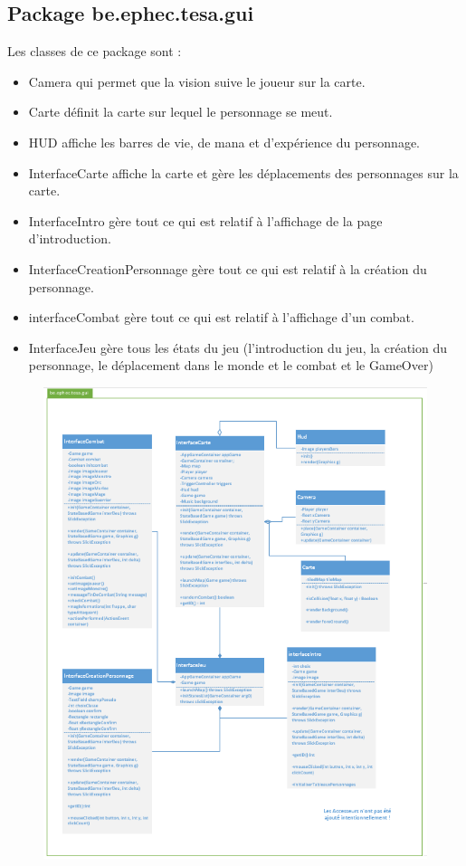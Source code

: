 \documentclass[a4paper,titlepage]{article}
\begin{document}
	\newpage
	\subsection{Package \og be.ephec.tesa.gui \fg{} }
	Les classes de ce package sont :
	\begin{itemize}
		\item \og Camera \fg{} qui permet que la vision suive le joueur sur la carte.
		\item \og Carte \fg{} définit la carte sur lequel le personnage se meut. 
		\item \og HUD \fg{}  affiche les barres de vie, de mana et d'expérience du personnage.
		\item \og InterfaceCarte \fg{} affiche la carte et gère les déplacements des personnages sur la carte.
		\item \og InterfaceIntro \fg{} gère tout ce qui est relatif à l'affichage de la page d'introduction.
		\item \og InterfaceCreationPersonnage \fg{} gère tout ce qui est relatif à la création du personnage.
		\item \og interfaceCombat \fg{} gère tout ce qui est relatif à l'affichage d'un combat.
		\item \og InterfaceJeu \fg{} gère tous les états du jeu (l'introduction du jeu, la création du personnage, le déplacement dans le monde et le combat et le GameOver)
	\end{itemize}
	\begin{figure}[h!]
		\includegraphics[scale=0.92]{Pgui.png}
	\end{figure}
	\clearpage
	
\end{document}
